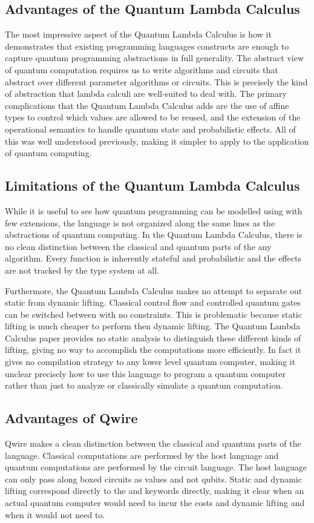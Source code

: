 \subsection{Advantages of the Quantum Lambda Calculus}
The most impressive aspect of the Quantum Lambda Calculus is how it demonstrates that existing programming languages constructs are enough to capture quantum programming abstractions in full generality.
The abstract view of quantum computation requires us to write algorithms and circuits that abstract over different parameter algorithms or circuits.
This is precisely the kind of abstraction that lambda calculi are well-suited to deal with.
The primary complications that the Quantum Lambda Calculus adds are the use of affine types to control which values are allowed to be reused, and the extension of the operational semantics to handle quantum state and probabilistic effects.
All of this was well understood previously, making it simpler to apply to the application of quantum computing. 

\subsection{Limitations of the Quantum Lambda Calculus}
While it is useful to see how quantum programming can be modelled using with few extensions, the language is not organized along the same lines as the abstractions of quantum computing.
In the Quantum Lambda Calculus, there is no clean distinction between the classical and quantum parts of the any algorithm.
Every function is inherently stateful and probabilistic and the effects are not tracked by the type system at all.

Furthermore, the Quantum Lambda Calculus makes no attempt to separate out static from dynamic lifting.
Classical control flow and controlled quantum gates can be switched between with no constraints.
This is problematic because static lifting is much cheaper to perform then dynamic lifting.
The Quantum Lambda Calculus paper provides no static analysis to distinguish these different kinds of lifting, giving no way to accomplish the computations more efficiently.
In fact it gives no compilation strategy to any lower level quantum computer, making it unclear precisely how to use this language to program a quantum computer rather than just to analyze or classically simulate a quantum computation.

\subsection{Advantages of Qwire}
Qwire makes a clean distinction between the classical and quantum parts of the language.
Classical computations are performed by the host language and quantum computations are performed by the circuit language.
The host language can only pass along boxed circuits as values and not qubits.
Static and dynamic lifting correspond directly to the  and  keywords directly, making it clear when an actual quantum computer would need to incur the costs and dynamic lifting and when it would not need to.

